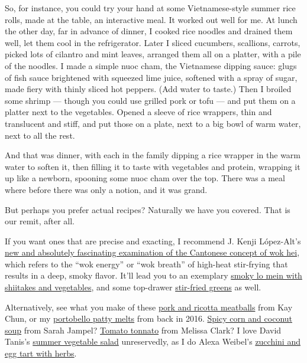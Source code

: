 So, for instance, you could try your hand at some Vietnamese-style
summer rice rolls, made at the table, an interactive meal. It worked out
well for me. At lunch the other day, far in advance of dinner, I cooked
rice noodles and drained them well, let them cool in the refrigerator.
Later I sliced cucumbers, scallions, carrots, picked lots of cilantro
and mint leaves, arranged them all on a platter, with a pile of the
noodles. I made a simple nuoc cham, the Vietnamese dipping sauce: glugs
of fish sauce brightened with squeezed lime juice, softened with a spray
of sugar, made fiery with thinly sliced hot peppers. (Add water to
taste.) Then I broiled some shrimp --- though you could use grilled pork
or tofu --- and put them on a platter next to the vegetables. Opened a
sleeve of rice wrappers, thin and translucent and stiff, and put those
on a plate, next to a big bowl of warm water, next to all the rest.

And that was dinner, with each in the family dipping a rice wrapper in
the warm water to soften it, then filling it to taste with vegetables
and protein, wrapping it up like a newborn, spooning some nuoc cham over
the top. There was a meal where before there was only a notion, and it
was grand.

But perhaps you prefer actual recipes? Naturally we have you covered.
That is our remit, after all.

If you want ones that are precise and exacting, I recommend J. Kenji
López-Alt's
\href{https://www.nytimes3xbfgragh.onion/2020/09/04/dining/stir-fry-recipe-wok-hei.html}{new
and absolutely fascinating examination of the Cantonese concept of wok
hei}, which refers to the ``wok energy'' or ``wok breath'' of high-heat
stir-frying that results in a deep, smoky flavor. It'll lead you to an
exemplary
\href{https://cooking.nytimes3xbfgragh.onion/recipes/1021379-smoky-lo-mein-with-shiitake-and-vegetables}{smoky
lo mein with shiitakes and vegetables}, and some top-drawer
\href{https://cooking.nytimes3xbfgragh.onion/recipes/1021378-smoky-stir-fried-greens}{stir-fried
greens} as well.

Alternatively, see what you make of these
\href{https://cooking.nytimes3xbfgragh.onion/recipes/1019765-pork-and-ricotta-meatballs}{pork
and ricotta meatballs} from Kay Chun, or my
\href{https://cooking.nytimes3xbfgragh.onion/recipes/1018279-portobello-patty-melts}{portobello
patty melts} from back in 2016.
\href{https://cooking.nytimes3xbfgragh.onion/recipes/1019451-spicy-corn-and-coconut-soup}{Spicy
corn and coconut soup} from Sarah Jampel?
\href{https://cooking.nytimes3xbfgragh.onion/recipes/12664-tomato-tonnato}{Tomato
tonnato} from Melissa Clark? I love David Tanis's
\href{https://cooking.nytimes3xbfgragh.onion/recipes/1019518-summer-vegetable-salad}{summer
vegetable salad} unreservedly, as I do Alexa Weibel's
\href{https://cooking.nytimes3xbfgragh.onion/recipes/1020143-zucchini-and-egg-tart-with-fresh-herbs}{zucchini
and egg tart with herbs}.

